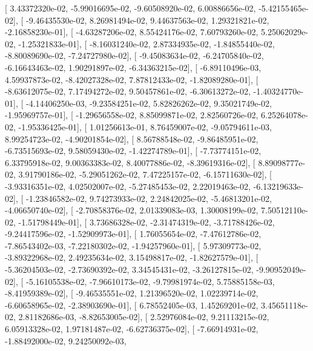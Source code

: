\documentclass{article}
\begin{document}
       [  3.43372320e-02,  -5.99016695e-02,  -9.60508920e-02,
          6.00886656e-02,  -5.42155465e-02],
       [ -9.46435530e-02,   8.26981494e-02,   9.44637563e-02,
          1.29321821e-02,  -2.16858230e-01],
       [ -4.63287206e-02,   8.55424176e-02,   7.60793260e-02,
          5.25062029e-02,  -1.25321833e-01],
       [ -8.16031240e-02,   2.87334935e-02,  -1.84855440e-02,
         -8.80089690e-02,  -7.24727980e-02],
       [ -9.45083634e-02,  -6.24705840e-02,  -6.16643463e-02,
          1.90291897e-02,  -6.34363215e-02],
       [ -6.89110496e-03,   4.59937873e-02,  -8.42027328e-02,
          7.87812433e-02,  -1.82089280e-01],
       [ -8.63612075e-02,   7.17494272e-02,   9.50457861e-02,
         -6.30613272e-02,  -1.40324770e-01],
       [ -4.14406250e-03,  -9.23584251e-02,   5.82826262e-02,
          9.35021749e-02,  -1.95969757e-01],
       [ -1.29656558e-02,   8.85099871e-02,   2.82560726e-02,
          6.25264078e-02,  -1.95336425e-01],
       [  1.01256613e-01,   8.76459007e-02,  -9.05794611e-03,
          8.99254723e-02,  -4.90201854e-02],
       [  8.56788548e-02,  -9.86485951e-02,  -6.73515693e-02,
          9.58059430e-02,  -1.42274789e-01],
       [ -7.73774151e-02,   6.33795918e-02,   9.00363383e-02,
          8.40077886e-02,  -8.39619316e-02],
       [  8.89098777e-02,   3.91790186e-02,  -5.29051262e-02,
          7.47225157e-02,  -6.15711630e-02],
       [ -3.93316351e-02,   4.02502007e-02,  -5.27485453e-02,
          2.22019463e-02,  -6.13219633e-02],
       [ -1.23846582e-02,   9.74273933e-02,   2.24842025e-02,
         -5.46813201e-02,  -4.06650740e-02],
       [ -2.70858376e-02,   2.01339083e-03,   1.30008199e-02,
          7.50512110e-02,  -1.51798449e-01],
       [  3.73686328e-02,  -2.31474319e-02,  -3.71788426e-02,
         -9.24417596e-02,  -1.52909973e-01],
       [  1.76055654e-02,  -7.47612786e-02,  -7.86543402e-03,
         -7.22180302e-02,  -1.94257960e-01],
       [  5.97309773e-02,  -3.89322968e-02,   2.49235634e-02,
          3.15498817e-02,  -1.82627579e-01],
       [ -5.36204503e-02,  -2.73690392e-02,   3.34545431e-02,
         -3.26127815e-02,  -9.90952049e-02],
       [ -5.16105538e-02,  -7.96610173e-02,  -9.79981974e-02,
          5.75885158e-03,  -8.41959389e-02],
       [ -9.46535551e-02,   1.21396520e-02,   1.02239714e-02,
         -6.60658965e-02,  -2.38903690e-01],
       [  6.78552405e-03,   1.45269201e-02,   3.45651118e-02,
          2.81182686e-03,  -8.82653005e-02],
       [  2.52976084e-02,   9.21113215e-02,   6.05913328e-02,
          1.97181487e-02,  -6.62736375e-02],
       [ -7.66914931e-02,  -1.88492000e-02,   9.24250092e-03,
\end{document}
